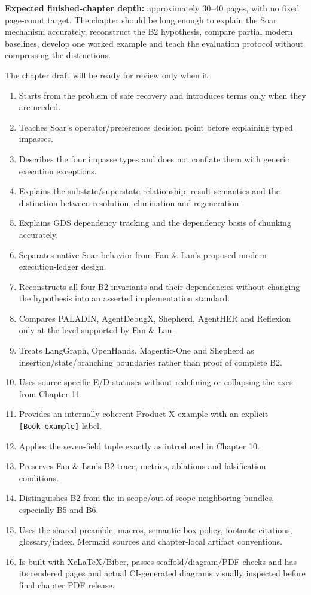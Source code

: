 \textbf{Expected finished-chapter depth:} approximately 30--40 pages, with no fixed page-count target. The chapter should be long enough to explain the Soar mechanism accurately, reconstruct the B2 hypothesis, compare partial modern baselines, develop one worked example and teach the evaluation protocol without compressing the distinctions.

The chapter draft will be ready for review only when it:

\begin{enumerate}
\def\labelenumi{\arabic{enumi}.}
\tightlist
\item
  Starts from the problem of safe recovery and introduces terms only when they are needed.
\item
  Teaches Soar's operator/preferences decision point before explaining typed impasses.
\item
  Describes the four impasse types and does not conflate them with generic execution exceptions.
\item
  Explains the substate/superstate relationship, result semantics and the distinction between resolution, elimination and regeneration.
\item
  Explains GDS dependency tracking and the dependency basis of chunking accurately.
\item
  Separates native Soar behavior from Fan \& Lan's proposed modern execution-ledger design.
\item
  Reconstructs all four B2 invariants and their dependencies without changing the hypothesis into an asserted implementation standard.
\item
  Compares PALADIN, AgentDebugX, Shepherd, AgentHER and Reflexion only at the level supported by Fan \& Lan.
\item
  Treats LangGraph, OpenHands, Magentic-One and Shepherd as insertion/state/branching boundaries rather than proof of complete B2.
\item
  Uses source-specific E/D statuses without redefining or collapsing the axes from Chapter 11.
\item
  Provides an internally coherent Product X example with an explicit \texttt{{[}Book\ example{]}} label.
\item
  Applies the seven-field tuple exactly as introduced in Chapter 10.
\item
  Preserves Fan \& Lan's B2 trace, metrics, ablations and falsification conditions.
\item
  Distinguishes B2 from the in-scope/out-of-scope neighboring bundles, especially B5 and B6.
\item
  Uses the shared preamble, macros, semantic box policy, footnote citations, glossary/index, Mermaid sources and chapter-local artifact conventions.
\item
  Is built with XeLaTeX/Biber, passes scaffold/diagram/PDF checks and has its rendered pages and actual CI-generated diagrams visually inspected before final chapter PDF release.
\end{enumerate}

